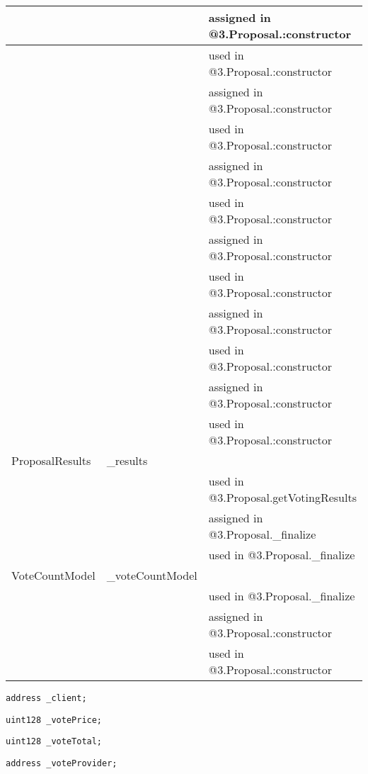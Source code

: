\begin{tabular}{|l|l|p{5cm}|}
 & & assigned in @3.Proposal.:constructor\\\hline
 & & used in @3.Proposal.:constructor\\\hline
 & & assigned in @3.Proposal.:constructor\\\hline
 & & used in @3.Proposal.:constructor\\\hline
 & & assigned in @3.Proposal.:constructor\\\hline
 & & used in @3.Proposal.:constructor\\\hline
 & & assigned in @3.Proposal.:constructor\\\hline
 & & used in @3.Proposal.:constructor\\\hline
 & & assigned in @3.Proposal.:constructor\\\hline
 & & used in @3.Proposal.:constructor\\\hline
 & & assigned in @3.Proposal.:constructor\\\hline
 & & used in @3.Proposal.:constructor\\\hline
ProposalResults & \_{}results &  \\\hline
 & & used in @3.Proposal.getVotingResults\\\hline
 & & assigned in @3.Proposal.\_{}finalize\\\hline
 & & used in @3.Proposal.\_{}finalize\\\hline
VoteCountModel & \_{}voteCountModel &  \\\hline
 & & used in @3.Proposal.\_{}finalize\\\hline
 & & assigned in @3.Proposal.:constructor\\\hline
 & & used in @3.Proposal.:constructor\\\hline
\end{tabular}
\fi


\begin{lstlisting}[firstnumber=18]
    address _client;
\end{lstlisting}

\begin{lstlisting}[firstnumber=20]
    uint128 _votePrice;
\end{lstlisting}

\begin{lstlisting}[firstnumber=21]
    uint128 _voteTotal;
\end{lstlisting}

\begin{lstlisting}[firstnumber=22]
    address _voteProvider;
\end{lstlisting}

